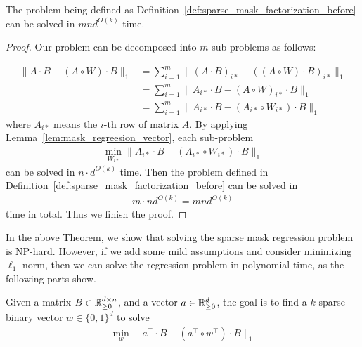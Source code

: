 \begin{theorem}\label{thm:mask_regression}
The problem being defined as Definition~\ref{def:sparse_mask_factorization_before} can be solved in $m n d^{O(k)}$ time.
\end{theorem}

\begin{proof}
Our problem can be decomposed into $m$ sub-problems as follows:

\begin{align*}
    \| A\cdot B - (A\circ W) \cdot B \|_1 & =  \sum_{i=1}^m \big\|(A\cdot B)_{i*} - ((A\circ W) \cdot B)_{i*}  \big\|_1 \\
    & = \sum_{i=1}^m\big\|A_{i*}\cdot B - (A\circ W)_{i*} \cdot B \big\|_1 \\
    & = \sum_{i=1}^m\big\|A_{i*}\cdot B - (A_{i*}\circ W_{i*}) \cdot B  \big\|_1
\end{align*}
where $A_{i*}$ means the $i$-th row of matrix $A$. By applying Lemma~\ref{lem:mask_regreesion_vector}, each sub-problem
\begin{align*}
    \min_{W_{i*}} \| A_{i*}\cdot B - (A_{i*}\circ W_{i*}) \cdot B \|_1
\end{align*}
can be solved in $n \cdot d^{O(k)}$ time. Then the problem defined in Definition~\ref{def:sparse_mask_factorization_before} can be solved in 
\begin{align*}
    m \cdot n d^{O(k)} = m n d^{O(k)}
\end{align*}
time in total. Thus we finish the proof.
\end{proof}


In the above Theorem, we show that solving the sparse mask regression problem is NP-hard. However, if we add some mild assumptions and consider minimizing $\ell_1$ norm, then we can solve the regression problem in polynomial time, as the following parts show. 

\begin{definition}
Given a matrix $B\in\mathbb{R}_{\geq 0}^{d\times n}$, and a vector $a\in\mathbb{R}_{\geq 0}^d$, the goal is to find a $k$-sparse binary vector $w\in\{0,1\}^d$ to solve
\begin{align*}
    \min_{w} \|a^\top \cdot B -  (a^\top \circ w^\top) \cdot B\|_1
\end{align*}
\end{definition}

